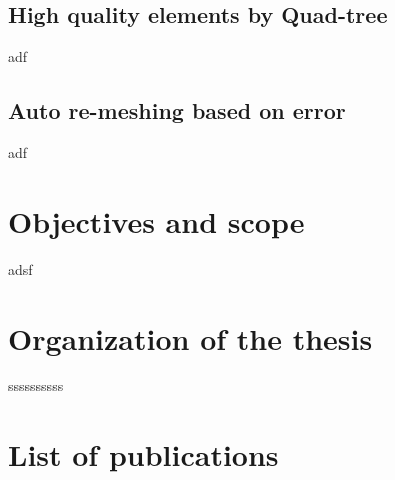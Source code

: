     \subsection{High quality elements by Quad-tree}
    adf
    \subsection{Auto re-meshing based on error}
    adf
\section{Objectives and scope}
adsf
\section{Organization of the thesis}
ssssssssss
\section{List of publications}


